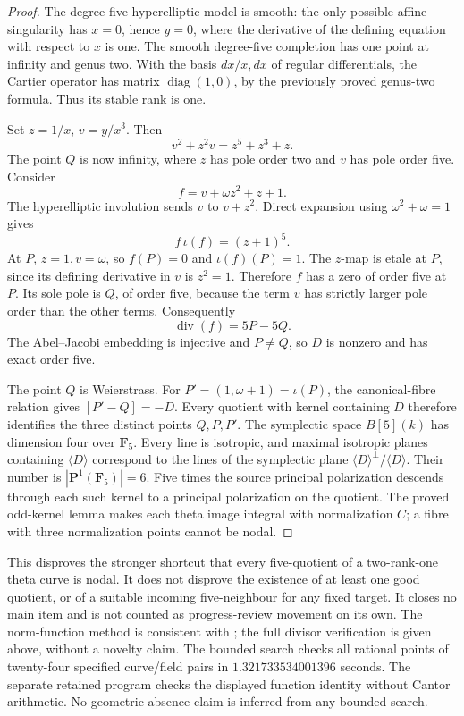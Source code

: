 \begin{proof}
The degree-five hyperelliptic model is smooth: the only possible
affine singularity has $x=0$, hence $y=0$, where the derivative
of the defining equation with respect to $x$ is one. The smooth
degree-five completion has one point at infinity and genus two.
With the basis $dx/x,dx$ of regular differentials, the Cartier
operator has matrix $\operatorname{diag}(1,0)$, by the previously
proved genus-two formula. Thus its stable rank is one.

Set $z=1/x$, $v=y/x^3$. Then
\[
             v^2+z^2v=z^5+z^3+z.
\]
The point $Q$ is now infinity, where $z$ has pole order two and
$v$ has pole order five. Consider
\[
              f=v+\omega z^2+z+1.
\]
The hyperelliptic involution sends $v$ to $v+z^2$. Direct expansion
using $\omega^2+\omega=1$ gives
\[
      f\,\iota(f)=(z+1)^5.
\]
At $P$, $z=1,v=\omega$, so $f(P)=0$ and $\iota(f)(P)=1$.
The $z$-map is etale at $P$, since its defining derivative in
$v$ is $z^2=1$. Therefore $f$ has a zero of order five at $P$.
Its sole pole is $Q$, of order five, because the term $v$ has
strictly larger pole order than the other terms. Consequently
\[
                   \operatorname{div}(f)=5P-5Q.
\]
The Abel--Jacobi embedding is injective and $P\ne Q$, so $D$ is
nonzero and has exact order five.

The point $Q$ is Weierstrass. For $P'=(1,\omega+1)=\iota(P)$,
the canonical-fibre relation gives $[P'-Q]=-D$.
Every quotient with kernel containing $D$ therefore identifies
the three distinct points $Q,P,P'$. The symplectic space $B[5](k)$
has dimension four over $\mathbf F_5$. Every line is isotropic,
and maximal isotropic planes containing $\langle D\rangle$
correspond to the lines of the symplectic plane
$\langle D\rangle^\perp/\langle D\rangle$. Their number is
$|\mathbf P^1(\mathbf F_5)|=6$. Five times the source principal polarization descends through
each such kernel to a principal polarization on the quotient.
The proved odd-kernel lemma makes each theta image integral with
normalization $C$; a fibre with three normalization points cannot
be nodal.
\end{proof}

\begin{remark}
\label{rem:root-f1-bad-five-kernel-scope}
This disproves the stronger shortcut that every five-quotient of
a two-rank-one theta curve is nodal. It does not disprove the
existence of at least one good quotient, or of a suitable incoming
five-neighbour for any fixed target. It closes no main item and
is not counted as progress-review movement on its own.
The norm-function method is consistent with
\citep[Proposition~1.1]{BoxallGrantLeprevost2001}; the full divisor
verification is given above, without a novelty claim.
The bounded search  checks all
rational points of twenty-four specified curve/field pairs in
$1.321733534001396$ seconds. The separate retained program
checks the displayed function identity without Cantor arithmetic.
No geometric absence claim is inferred from any bounded search.
\end{remark}
